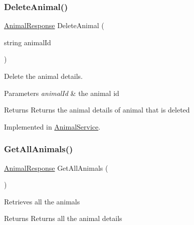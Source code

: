\subsubsection{\texorpdfstring{Delete\+Animal()}{DeleteAnimal()}}
{\footnotesize\ttfamily \hyperlink{classWildLifeTracker_1_1Response_1_1AnimalResponse}{Animal\+Response} Delete\+Animal (\begin{DoxyParamCaption}\item[{string}]{animal\+Id }\end{DoxyParamCaption})}



Delete the animal details. 
\begin{DoxyParams}{Parameters}
{\em animal\+Id} & the animal id\\
\hline
\end{DoxyParams}
\begin{DoxyReturn}{Returns}
Returns the animal details of animal that is deleted
\end{DoxyReturn}




Implemented in \hyperlink{classWildLifeTracker_1_1Services_1_1AnimalService_a201e384747e50bd19c431955eae072fa}{Animal\+Service}.

\mbox{\label{interfaceWildLifeTracker_1_1Services_1_1IAnimalService_a38b8ef318dc92ac93cfcbbc33a454c5a}} 
\subsubsection{\texorpdfstring{Get\+All\+Animals()}{GetAllAnimals()}}
{\footnotesize\ttfamily \hyperlink{classWildLifeTracker_1_1Response_1_1AnimalResponse}{Animal\+Response} Get\+All\+Animals (\begin{DoxyParamCaption}{ }\end{DoxyParamCaption})}



Retrieves all the animals \begin{DoxyReturn}{Returns}
Returns all the animal details
\end{DoxyReturn}




